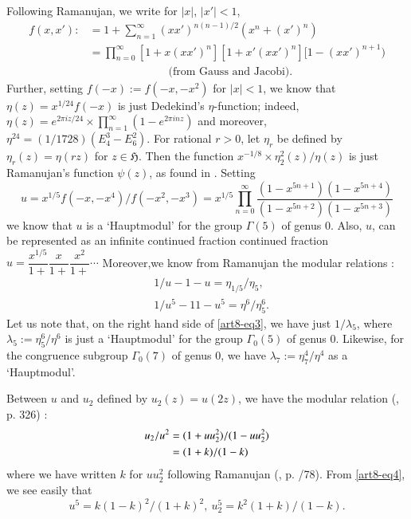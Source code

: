 Following Ramanujan, we write for $|x|$, $|x'|<1$,
\begin{align*}
f(x,x') :&= 1+\sum\limits^{\infty}_{n=1}(xx')^{n(n-1)/2}(x^{n}+(x')^{n})\\
         &= \prod\limits^{\infty}_{n=0}[1+x(xx')^{n}][1+x'(xx')^{n}][1-(xx')^{n+1})\\
         &\hspace{3cm}\text{(from Gauss and Jacobi).}
\end{align*}
Further, setting $f(-x):=f(-x,-x^{2})$ for $|x|<1$, we know that $\eta(z)=x^{1/24}f(-x)$ is just Dedekind's $\eta$-function; indeed, $\eta(z)=e^{2\pi iz/24}\times \prod\limits^{\infty}_{n=1}(1-e^{2\pi inz})$ and moreover, $\eta^{24}=(1/1728)(E^{3}_{4}-E^{2}_{6})$. For rational $r>0$, let $\eta_{r}$ be defined by $\eta_{r}(z)=\eta(rz)$ for $z\in \mathfrak{H}$. Then the function $x^{-1/8}\times \eta^{2}_{2}(z)/\eta(z)$ is just Ramanujan's function $\psi(z)$, as found in \cite{art8-key10;art8-key11}. Setting 
$$
u=x^{1/5}f(-x,-x^{4})/f(-x^{2},-x^{3})=x^{1/5}\prod\limits^{\infty}_{n=0}\frac{(1-x^{5n+1})(1-x^{5n+4})}{(1-x^{5n+2})(1-x^{5n+3})}
$$
we know that $u$ is a `Hauptmodul' for the group $\Gamma(5)$ of genus $0$. Also, $u$, can be represented as an infinite continued fraction continued fraction $u=\dfrac{x^{1/5}}{1+}\dfrac{x}{1+}\dfrac{x^{2}}{1+}\cdots$ Moreover,\pageoriginale we know from Ramanujan \cite{art8-key10} the modular relations :
\begin{align}
& 1/u-1-u=\eta_{1/5}/\eta_{5},\label{art8-eq2}\\
& 1/u^{5}-11-u^{5}=\eta^{6}/\eta^{6}_{5}.\label{art8-eq3}
\end{align}
Let us note that, on the right hand side of \eqref{art8-eq3}, we have just $1/\lambda_{5}$, where $\lambda_{5}:=\eta^{6}_{5}/\eta^{6}$ is just a `Hauptmodul' for the group $\Gamma_{0}(5)$ of genus $0$. Likewise, for the congruence subgroup $\Gamma_{0}(7)$ of genus $0$, we have $\lambda_{7} := \eta^{4}_{7}/\eta^{4}$ as a `Hauptmodul'.

Between $u$ and $u_{2}$ defined by $u_{2}(z)=u(2z)$, we have the modular relation (\cite{art8-key10}, p. 326) :
\begin{align}
u_{2}/u^{2} &= (1+uu^{2}_{2})/(1-uu^{2}_{2})\notag\\
          &= (1+k)/(1-k)\label{art8-eq4}
\end{align}
where we have written $k$ for $uu^{2}_{2}$ following Ramanujan (\cite{art8-key11}, p. /78). From \eqref{art8-eq4}, we see easily that
\begin{equation}
u^{5}=k(1-k)^{2}/(1+k)^{2}, \ u^{5}_{2}=k^{2}(1+k)/(1-k).\label{art8-eq5}
\end{equation}

